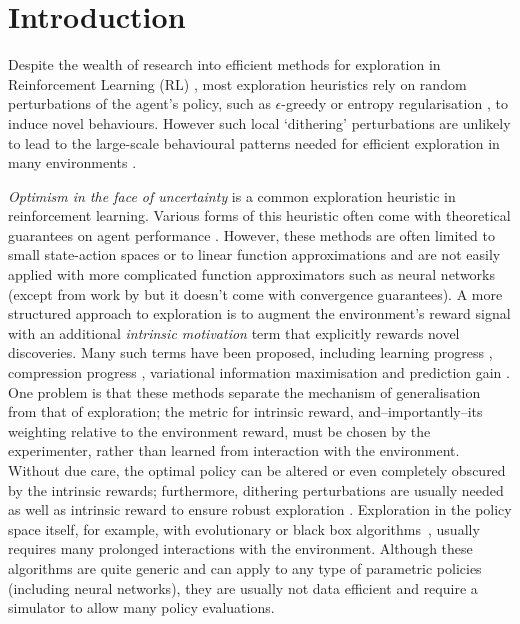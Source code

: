 \documentclass{article}
\begin{document}
\section{Introduction}
\label{sec:introduction}
Despite the wealth of research into efficient methods for exploration in Reinforcement Learning (RL) \citep{kearns2002near,jaksch2010near}, most exploration heuristics rely on random perturbations of the agent's policy, such as $\epsilon$-greedy \citep{sutton1998reinforcement} or entropy regularisation \citep{williams1992simple}, to induce novel behaviours. 
However such local `dithering' perturbations are unlikely to lead to the large-scale behavioural patterns needed for efficient exploration in many environments \citep{osband2017deep}.

\textit{Optimism in the face of uncertainty} is a common exploration heuristic in reinforcement learning.
Various forms of this heuristic often come with theoretical guarantees on agent performance \citep{azar2017minimax,lattimore2013sample,jaksch2010near,auer2007logarithmic,kearns2002near}.
However, these methods are often limited to small state-action spaces or to linear function approximations and are not easily applied with more complicated function approximators such as neural networks (except from work by \citep{geist2010kalman,geist2010managing} but it doesn't come with convergence guarantees). A more structured approach to exploration is to augment the environment's reward signal with an additional \textit{intrinsic motivation} term \citep{singh2004intrinsically} that explicitly rewards novel discoveries.
Many such terms have been proposed, including learning progress \citep{oudeyer07intrinsic}, compression progress \citep{schmidhuber2010formal}, variational information maximisation \citep{houthooft2016vime} and prediction gain \citep{bellemare2016unifying}.
One problem is that these methods separate the mechanism of generalisation from that of exploration; the metric for intrinsic reward, and--importantly--its weighting relative to the environment reward, must be chosen by the experimenter, rather than learned from interaction with the environment.
Without due care, the optimal policy can be altered or even completely obscured by the intrinsic rewards; furthermore, dithering perturbations are usually needed as well as intrinsic reward to ensure robust exploration \citep{ostrovski2017count}. 
Exploration in the policy space itself, for example, with evolutionary or black box  algorithms~\citep{moriarty1999evolutionary,fix2012monte,2017arXiv170303864S}, usually requires many prolonged interactions with the environment. Although these algorithms are quite generic and can apply to any type of parametric policies (including neural networks), they are usually not data efficient and require a simulator to allow many policy evaluations.
\end{document}
